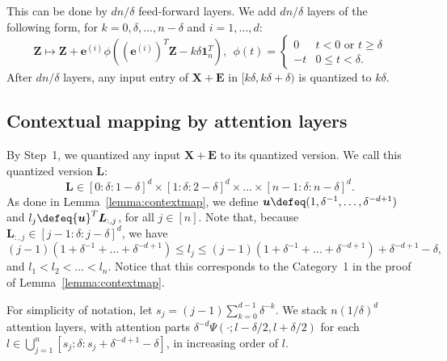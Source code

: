 \documentclass{article} %
\def\vone{{\bm{1}}}
\def\ve{{\bm{e}}}
\def\vu{{\bm{u}}}
\def\mE{{\bm{E}}}
\def\mL{{\bm{L}}}
\def\mX{{\bm{X}}}
\def\mZ{{\bm{Z}}}
\begin{document}
This can be done by $dn/\delta$ feed-forward layers.
We add $dn/\delta$ layers of the following form, for $k = 0, \delta, \dots, n-\delta$ and $i = 1, \dots, d$:
\begin{equation*}
    \mZ \mapsto \mZ + \ve^{(i)} \phi( (\ve^{(i)})^T \mZ - k\delta \vone_n^T),
    ~~
    \phi(t) = 
    \begin{cases}
    0 & t < 0 \text{ or } t \geq \delta\\
    -t & 0 \leq t < \delta.
    \end{cases}
\end{equation*}
After $dn/\delta$ layers, any input entry of $\mX + \mE$ in $[k\delta, k\delta+\delta)$ is quantized to $k\delta$.


\subsection{Contextual mapping by attention layers}
By Step~1, we quantized any input $\mX + \mE$ to its quantized version. We call this quantized version $\mL$:
\begin{equation*}
\mL \in [0:\delta:1-\delta]^d \times [1:\delta:2-\delta]^d \times \dots \times [n-1:\delta:n-\delta]^d.
\end{equation*}
As done in Lemma~\ref{lemma:contextmap}, we define $\vu \defeq (1, \delta^{-1}, \dots, \delta^{-d+1})$ and $l_j \defeq \vu^T \mL_{:,j}$, for all $j \in [n]$.
Note that, because $\mL_{:,j} \in [j-1:\delta:j-\delta]^d$, we have
\begin{equation*}
    (j-1)(1+\delta^{-1}+\dots+\delta^{-d+1}) \leq l_j \leq (j-1)(1+\delta^{-1}+\dots+\delta^{-d+1}) + \delta^{-d+1} - \delta,
\end{equation*}
and $l_1 < l_2 < \dots < l_n$. Notice that this corresponds to the Category~1 in the proof of Lemma~\ref{lemma:contextmap}.

For simplicity of notation, let $s_j = (j-1) \sum_{k=0}^{d-1} \delta^{-k}$.
We stack $n(1/\delta)^d$ attention layers, with attention parts $\delta^{-d} \Psi(\cdot;l-\delta/2,l+\delta/2)$ for each $l \in \bigcup_{j=1}^n [s_j :\delta: s_j + \delta^{-d+1} - \delta]$, in increasing order of $l$.
\end{document}
